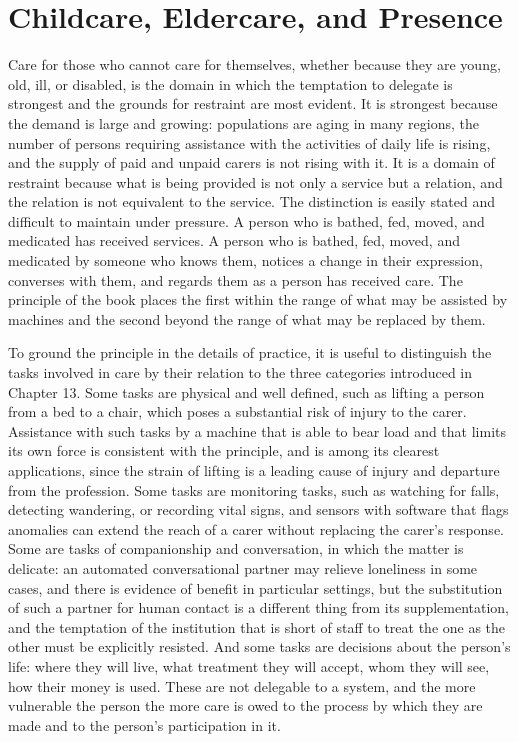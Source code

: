 \chapter{Childcare, Eldercare, and Presence}
\label{ch:14}

Care for those who cannot care for themselves, whether because they are young, old, ill, or disabled, is the domain in which the temptation to delegate is strongest and the grounds for restraint are most evident. It is strongest because the demand is large and growing: populations are aging in many regions, the number of persons requiring assistance with the activities of daily life is rising, and the supply of paid and unpaid carers is not rising with it. It is a domain of restraint because what is being provided is not only a service but a relation, and the relation is not equivalent to the service. The distinction is easily stated and difficult to maintain under pressure. A person who is bathed, fed, moved, and medicated has received services. A person who is bathed, fed, moved, and medicated by someone who knows them, notices a change in their expression, converses with them, and regards them as a person has received care. The principle of the book places the first within the range of what may be assisted by machines and the second beyond the range of what may be replaced by them.

To ground the principle in the details of practice, it is useful to distinguish the tasks involved in care by their relation to the three categories introduced in Chapter 13. Some tasks are physical and well defined, such as lifting a person from a bed to a chair, which poses a substantial risk of injury to the carer. Assistance with such tasks by a machine that is able to bear load and that limits its own force is consistent with the principle, and is among its clearest applications, since the strain of lifting is a leading cause of injury and departure from the profession. Some tasks are monitoring tasks, such as watching for falls, detecting wandering, or recording vital signs, and sensors with software that flags anomalies can extend the reach of a carer without replacing the carer's response. Some are tasks of companionship and conversation, in which the matter is delicate: an automated conversational partner may relieve loneliness in some cases, and there is evidence of benefit in particular settings, but the substitution of such a partner for human contact is a different thing from its supplementation, and the temptation of the institution that is short of staff to treat the one as the other must be explicitly resisted. And some tasks are decisions about the person's life: where they will live, what treatment they will accept, whom they will see, how their money is used. These are not delegable to a system, and the more vulnerable the person the more care is owed to the process by which they are made and to the person's participation in it.

